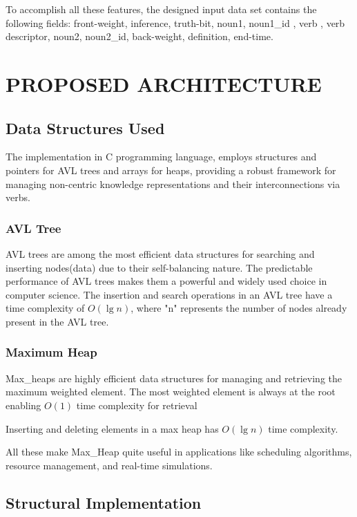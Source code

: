 \documentclass[conference]{IEEEtran}
\begin{document}
To accomplish all these features, the designed input data set contains the following fields: front-weight, inference, truth-bit, noun1, noun1\_id , verb , verb descriptor, noun2, noun2\_id, back-weight, definition, end-time.


\section{PROPOSED ARCHITECTURE}

\subsection{\textbf{Data Structures Used}}
The implementation in C programming language\cite{b9}, employs structures and pointers for AVL trees and arrays for heaps, providing a robust framework for managing non-centric knowledge representations and their interconnections via verbs.

\subsubsection{\textbf{AVL Tree}}

AVL trees are among the most efficient data structures for searching and inserting nodes(data) due to their 
self-balancing nature. The predictable performance of AVL trees makes them a powerful and widely used choice in computer science.
The insertion and search operations in an AVL tree have a time complexity of $O(\lg n)$, 
where "n" represents the number of nodes already present in the AVL tree.


\subsubsection{\textbf{Maximum Heap}}

Max\_heaps are highly efficient data structures for managing and retrieving the maximum weighted element. 
The most weighted element is always at the root enabling $O(1)$ time complexity for retrieval

Inserting and deleting elements in a max heap has $O(\lg n)$ time complexity.

All these make Max\_Heap quite useful in applications like scheduling algorithms, resource management, and real-time simulations.


\subsection{\textbf{Structural Implementation}}
\end{document}
